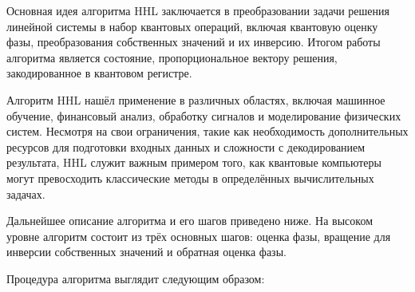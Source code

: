 Основная идея алгоритма HHL заключается в преобразовании задачи решения линейной системы в набор квантовых операций, включая квантовую оценку фазы, преобразования собственных значений и их инверсию. Итогом работы алгоритма является состояние, пропорциональное вектору решения, закодированное в квантовом регистре.

Алгоритм HHL нашёл применение в различных областях, включая машинное обучение, финансовый анализ, обработку сигналов и моделирование физических систем. Несмотря на свои ограничения, такие как необходимость дополнительных ресурсов для подготовки входных данных и сложности с декодированием результата, HHL служит важным примером того, как квантовые компьютеры могут превосходить классические методы в определённых вычислительных задачах.

Дальнейшее описание алгоритма и его шагов приведено ниже.
На высоком уровне алгоритм состоит из трёх основных шагов: оценка фазы, вращение для инверсии собственных значений и обратная оценка фазы.

Процедура алгоритма выглядит следующим образом:

